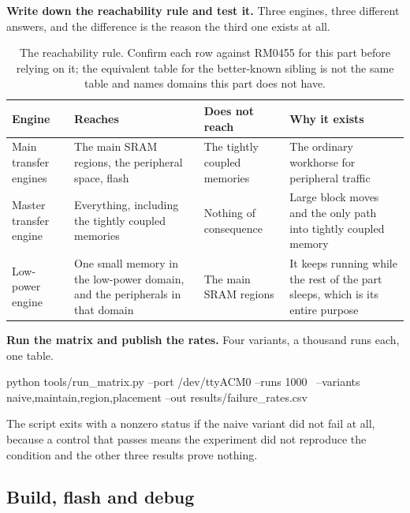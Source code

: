 \begin{steps}
\item \textbf{Write down the reachability rule and test it.} Three engines,
three different answers, and the difference is the reason the third one exists
at all.
\begin{table}[H]\centering\small
\begin{tabular}{p{30mm}p{46mm}p{34mm}p{34mm}}
\toprule
Engine & Reaches & Does not reach & Why it exists \\
\midrule
Main transfer engines & The main SRAM regions, the peripheral space, flash & The tightly coupled memories & The ordinary workhorse for peripheral traffic \\
Master transfer engine & Everything, including the tightly coupled memories & Nothing of consequence & Large block moves and the only path into tightly coupled memory \\
Low-power engine & One small memory in the low-power domain, and the peripherals in that domain & The main SRAM regions & It keeps running while the rest of the part sleeps, which is its entire purpose \\
\bottomrule
\end{tabular}
\caption{The reachability rule. Confirm each row against RM0455 for this part before relying on it; the equivalent table for the better-known sibling is not the same table and names domains this part does not have.}
\end{table}

\item \textbf{Run the matrix and publish the rates.} Four variants, a thousand
runs each, one table.
\begin{shellcode}
python tools/run_matrix.py --port /dev/ttyACM0 --runs 1000 \
  --variants naive,maintain,region,placement --out results/failure_rates.csv
\end{shellcode}
The script exits with a nonzero status if the naive variant did not fail at
all, because a control that passes means the experiment did not reproduce the
condition and the other three results prove nothing.
\end{steps}

\subsection*{Build, flash and debug}


